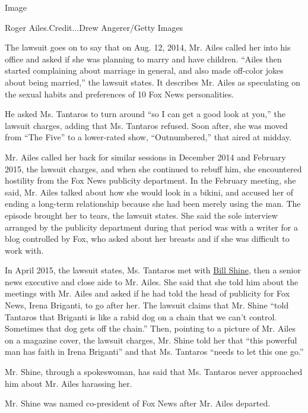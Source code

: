 Image

Roger Ailes.Credit...Drew Angerer/Getty Images

The lawsuit goes on to say that on Aug. 12, 2014, Mr. Ailes called her
into his office and asked if she was planning to marry and have
children. ``Ailes then started complaining about marriage in general,
and also made off-color jokes about being married,'' the lawsuit states.
It describes Mr. Ailes as speculating on the sexual habits and
preferences of 10 Fox News personalities.

He asked Ms. Tantaros to turn around ``so I can get a good look at
you,'' the lawsuit charges, adding that Ms. Tantaros refused. Soon
after, she was moved from ``The Five'' to a lower-rated show,
``Outnumbered,'' that aired at midday.

Mr. Ailes called her back for similar sessions in December 2014 and
February 2015, the lawsuit charges, and when she continued to rebuff
him, she encountered hostility from the Fox News publicity department.
In the February meeting, she said, Mr. Ailes talked about how she would
look in a bikini, and accused her of ending a long-term relationship
because she had been merely using the man. The episode brought her to
tears, the lawsuit states. She said the sole interview arranged by the
publicity department during that period was with a writer for a blog
controlled by Fox, who asked about her breasts and if she was difficult
to work with.

In April 2015, the lawsuit states, Ms. Tantaros met with
\href{http://www.nytimes3xbfgragh.onion/2016/08/16/business/media/bill-shine-steps-out-from-behind-the-scenes-to-lead-fox-news.html?_r=0}{Bill
Shine}, then a senior news executive and close aide to Mr. Ailes. She
said that she told him about the meetings with Mr. Ailes and asked if he
had told the head of publicity for Fox News, Irena Briganti, to go after
her. The lawsuit claims that Mr. Shine ``told Tantaros that Briganti is
like a rabid dog on a chain that we can't control. Sometimes that dog
gets off the chain.'' Then, pointing to a picture of Mr. Ailes on a
magazine cover, the lawsuit charges, Mr. Shine told her that ``this
powerful man has faith in Irena Briganti'' and that Ms. Tantaros ``needs
to let this one go.''

Mr. Shine, through a spokeswoman, has said that Ms. Tantaros never
approached him about Mr. Ailes harassing her.

Mr. Shine was named co-president of Fox News after Mr. Ailes departed.

